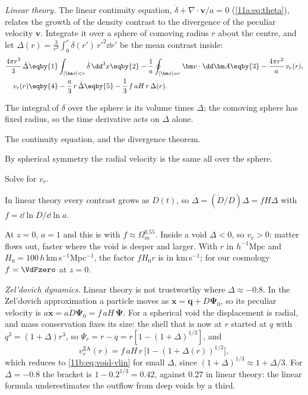 \emph{Linear theory.} The linear continuity equation,
$\dot\delta+\nabla\cdot\bm v/a=0$ (\eqref{11a:eq:theta}), relates the growth of
the density contrast to the divergence of the peculiar velocity $\bm v$. Integrate
it over a sphere of comoving radius $r$ about the centre, and let
$\Delta(r)=\frac{3}{r^3}\int_0^r\delta(r')\,r'^2\dd r'$ be the mean contrast inside:
\begin{align}
  \frac{4\pi r^3}{3}\,\dot\Delta
  &\eqby{1}\int_{|\bm x|<r}\dot\delta\,\dd^3x
   \eqby{2}-\frac1a\oint_{|\bm x|=r}\bm v\cdot\dd\bm A
   \eqby{3}-\frac{4\pi r^2}{a}\,v_r(r),\nonumber\\
  v_r(r)
  &\eqby{4}-\frac{a}{3}\,r\,\dot\Delta
   \eqby{5}-\frac13\,f\,aH\,r\,\Delta(r).
  \label{11b:eq:void-vlin}
\end{align}
\begin{explain}
  \item The integral of $\delta$ over the sphere is its volume times $\Delta$; the
        comoving sphere has fixed radius, so the time derivative acts on
        $\Delta$ alone.
  \item The continuity equation, and the divergence theorem.
  \item By spherical symmetry the radial velocity is the same all over the
        sphere.
  \item Solve for $v_r$.
  \item In linear theory every contrast grows as $D(t)$, so
        $\dot\Delta=(\dot D/D)\Delta=fH\Delta$ with $f=\dd\ln D/\dd\ln a$.
\end{explain}
At $z=0$, $a=1$ and this is  with
$f\approx\Omega_m^{0.55}$. Inside a void $\Delta<0$, so $v_r>0$: matter flows out,
faster where the void is deeper and larger. With $r$ in $h^{-1}$Mpc and
$H_0=100\,h$\,km\,s$^{-1}$Mpc$^{-1}$, the factor $fH_0r$ is in km\,s$^{-1}$; for our
cosmology $f=\VdFzero$ at $z=0$.

\emph{Zel'dovich dynamics.} Linear theory is not trustworthy where
$\Delta\approx-0.8$. In the Zel'dovich approximation a particle moves as
$\bm x=\bm q+D\bm\Psi_0$, so its peculiar velocity is
$a\dot{\bm x}=a\dot D\bm\Psi_0=f\,aH\,\bm\Psi$. For a spherical void the
displacement is radial, and mass conservation fixes its size: the shell that is now
at $r$ started at $q$ with $q^3=(1+\Delta)r^3$, so
$\Psi_r=r-q=r[1-(1+\Delta)^{1/3}]$, and
\begin{equation}
  v_r^{\mathrm{ZA}}(r)=f\,aH\,r\,\bigl[1-(1+\Delta(r))^{1/3}\bigr],
  \label{11b:eq:void-vza}
\end{equation}
which reduces to \eqref{11b:eq:void-vlin} for small $\Delta$, since
$(1+\Delta)^{1/3}\approx1+\Delta/3$. For $\Delta=-0.8$ the bracket is
$1-0.2^{1/3}=0.42$, against $0.27$ in linear theory: the linear formula
underestimates the outflow from deep voids by a third.

